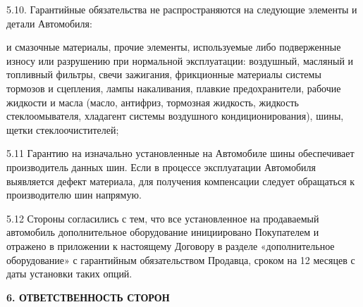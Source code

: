 \documentclass[a4paper,12pt]{article}
\begin{document}
\begin{description}\item5.10. Гарантийные обязательства не распространяются на следующие элементы и детали Автомобиля:\end{description}
 \begin{itemize} и смазочные материалы, прочие элементы, используемые либо подверженные износу или разрушению при нормальной эксплуатации: воздушный, масляный и топливный фильтры, свечи зажигания, фрикционные материалы системы тормозов и сцепления, лампы накаливания, плавкие предохранители, рабочие жидкости и масла (масло, антифриз, тормозная жидкость, жидкость стеклоомывателя, хладагент системы воздушного кондиционирования), шины, щетки стеклоочистителей;\end{itemize}
\begin{description}\item5.11  Гарантию на изначально установленные на Автомобиле шины обеспечивает производитель данных шин. 
Если в процессе эксплуатации Автомобиля выявляется дефект материала, для получения компенсации следует обращаться к производителю шин напрямую.\end{description}
\begin{description}\item5.12 Стороны согласились с тем, что все установленное на продаваемый автомобиль дополнительное оборудование инициировано Покупателем и отражено в приложении к настоящему Договору в разделе «дополнительное оборудование» с гарантийным обязательством  Продавца,  сроком  на 12 месяцев с даты установки таких опций.\end{description}

 \begin{center}
 \vspace{1 ex}
 \textbf{6. ОТВЕТСТВЕННОСТЬ СТОРОН }
 \vspace{1ex}
    \end{center}
\end{document}
